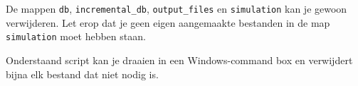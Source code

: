 \documentclass[a4paper,12pt,fleqn,twoside]{book}
\newcommand{\menu}[1]{\texttt{\textbf{#1}}}
\def\pijl{$\rightarrow$}%
\begin{document}
De mappen \lstinline|db|, \lstinline|incremental_db|, \lstinline|output_files|
en \lstinline|simulation| kan je gewoon verwijderen. Let erop dat je geen
eigen aangemaakte bestanden in de map \lstinline|simulation| moet hebben staan.

Onderstaand script kan je draaien in een Windows-command box en verwijdert
bijna elk bestand dat niet nodig is.

\medskip



%

%
\end{document}
